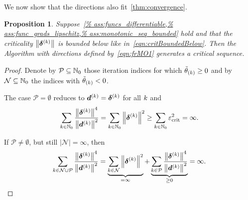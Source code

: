 \documentclass{article}
\theoremstyle{plain}
\newtheorem{proposition}[theorem]{Proposition}
\theoremstyle{definition}
\begin{document}
We now show that the directions also fit~\cref{thm:convergence}.
\begin{proposition}%
	\label{thm:frMO1convergence}
	Suppose~\cref{%
	ass:funcs_differentiable,%
	ass:func_grads_lipschitz,%
	ass:monotonic_seq_bounded}
	hold and that the criticality $\left\|\bm{\delta}^{(k)}\right\|$ is 
	bounded below like in~\eqref{eqn:critBoundedBelow}.
	Then the Algorithm with directions defined
	by~\eqref{eqn:frMO1} generates a critical sequence.
\end{proposition}

\begin{proof}

	Denote by $\mathcal P\subseteq \mathbb N_0$ those iteration
	indices for which $\tilde{\theta}_{(k)} \geq 0$ and 
	by $\mathcal N\subseteq \mathbb N_0$ the indices with 
	$\tilde{\theta}_{(k)} < 0$.
	
	The case $\mathcal P = \emptyset$ reduces to
	$\bm{d}^{(k)} = \bm{\delta}^{(k)}$ for all $k$ and 
	$$
	\sum_{k \in \mathbb N_0}
	\frac{\left\|\bm{\delta}^{(k)}\right\|^4}{\left\|\bm{d}^{(k)}\right\|^2}
	=
	\sum_{k \in \mathbb N_0}
	\left\|\bm{\delta}^{(k)}\right\|^2
	\geq \sum_{k \in \mathbb N_0} \varepsilon_{\mathrm{crit}}^2
	= 
	\infty.
	$$

	If $\mathcal P \neq \emptyset$, but still
	$|\mathcal N| = \infty$, then
	$$
	\sum_{k \in \mathcal N \cup \mathcal P}
	\frac{\left\|\bm{\delta}^{(k)}\right\|^4}{\left\|\bm{d}^{(k)}\right\|^2}
	=
	\underbrace{
		\sum_{k \in \mathcal N} \left\|\bm{\delta}^{(k)}\right\|^2
	}_{=\infty}
	+
	\underbrace{
		\sum_{k \in \mathcal P}
		\frac{\left\|\bm{\delta}^{(k)}\right\|^4}{\left\|\bm{d}^{(k)}\right\|^2}
	}_{\geq 0}
	= \infty.
	$$


\end{proof}
\end{document}
